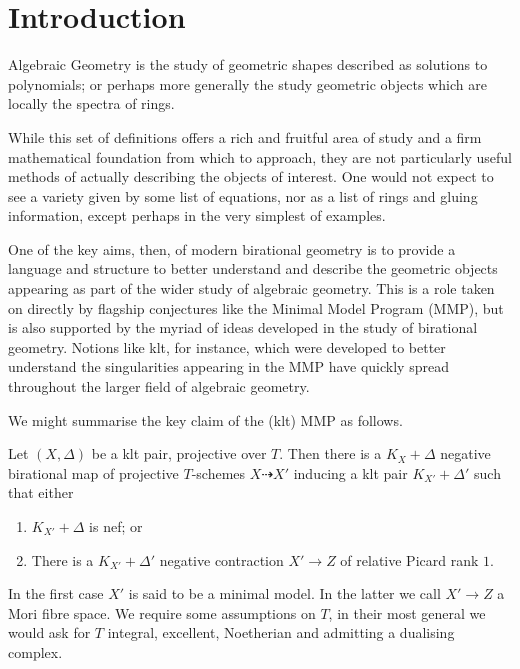 \documentclass[a4paper,12pt]{book}
\begin{document}
	\chapter{Introduction}

	Algebraic Geometry is the study of geometric shapes described as solutions to polynomials; or perhaps more generally the study geometric objects which are locally the spectra of rings.
	
	While this set of definitions offers a rich and fruitful area of study and a firm mathematical foundation from which to approach, they are not particularly useful methods of actually describing the objects of interest. One would not expect to see a variety given by some list of equations, nor as a list of rings and gluing information, except perhaps in the very simplest of examples.
	
	One of the key aims, then, of modern birational geometry is to provide a language and structure to better understand and describe the geometric objects appearing as part of the wider study of algebraic geometry. This is a role taken on directly by flagship conjectures like the Minimal Model Program (MMP), but is also supported by the myriad of ideas developed in the study of birational geometry. Notions like klt, for instance, which were developed to better understand the singularities appearing in the MMP have quickly spread throughout the larger field of algebraic geometry.
	
	We might summarise the key claim of the (klt) MMP as follows.
	
	\begin{conjecture*}
		Let $(X,\Delta)$ be a klt pair, projective over $T$. Then there is a $K_{X}+\Delta$ negative birational map of projective $T$-schemes $X \dashrightarrow X'$ inducing a klt pair $K_{X'}+\Delta'$ such that either
		
		\begin{enumerate}
			\item $K_{X'}+\Delta$ is nef; or
			\item There is a $K_{X'}+\Delta'$ negative contraction $X' \to Z$ of relative Picard rank $1$.
		\end{enumerate}
	\end{conjecture*}
	
	In the first case $X'$ is said to be a minimal model. In the latter we call $X' \to Z$ a Mori fibre space. We require some assumptions on $T$, in their most general we would ask for $T$ integral, excellent, Noetherian and admitting a dualising complex.
	
\end{document}
